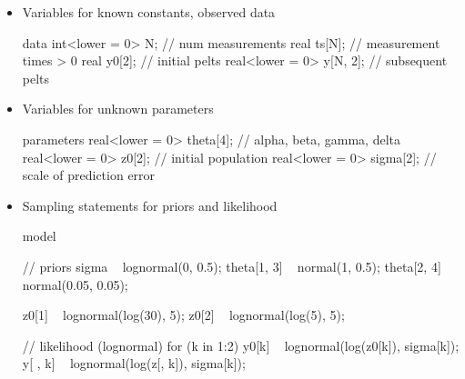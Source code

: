 \documentclass[10pt]{report}
\begin{document}
\begin{itemize}
\item Variables for known constants, observed data
{\footnotesize
\begin{stancode}
data {
  int<lower = 0> N;         // num measurements
  real ts[N];               // measurement times > 0
  real y0[2];               // initial pelts
  real<lower = 0> y[N, 2];  // subsequent pelts
}
\end{stancode}
}
\item Variables for unknown parameters
{\footnotesize
\begin{stancode}
parameters {
  real<lower = 0> theta[4];  // alpha, beta, gamma, delta
  real<lower = 0> z0[2];     // initial population
  real<lower = 0> sigma[2];  // scale of prediction error
}
\end{stancode}
}
\end{itemize}

%
\vspace*{-6pt}
\begin{itemize}
\item Sampling statements for priors and likelihood
\begin{stancode}
model {
  // priors
  sigma ~ lognormal(0, 0.5);
  theta[{1, 3}] ~ normal(1, 0.5);  theta[{2, 4}] ~ normal(0.05, 0.05);

  z0[1] ~ lognormal(log(30), 5);  z0[2] ~ lognormal(log(5), 5);

  // likelihood (lognormal)
  for (k in 1:2) {
    y0[k] ~ lognormal(log(z0[k]), sigma[k]);
    y[ , k] ~ lognormal(log(z[, k]), sigma[k]);
  }
}
\end{stancode}
\end{itemize}
\end{document}
